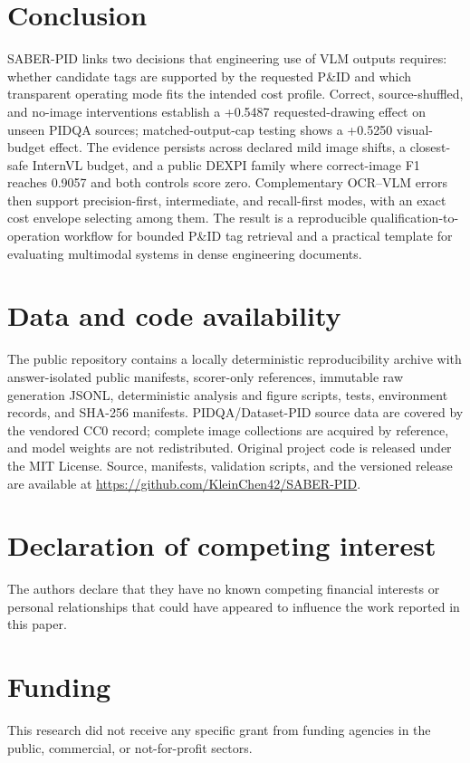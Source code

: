 \documentclass[11pt]{article}
\begin{document}
\section{Conclusion}

SABER-PID links two decisions that engineering use of VLM outputs requires:
whether candidate tags are supported by the requested P\&ID and which
transparent operating mode fits the intended cost profile. Correct,
source-shuffled, and no-image interventions establish a +0.5487
requested-drawing effect on unseen PIDQA sources; matched-output-cap testing
shows a +0.5250 visual-budget effect. The evidence persists across declared
mild image shifts, a closest-safe InternVL budget, and a public DEXPI family
where correct-image F1 reaches 0.9057 and both controls score zero. Complementary
OCR--VLM errors then support precision-first, intermediate, and recall-first
modes, with an exact cost envelope selecting among them. The result is a
reproducible qualification-to-operation workflow for bounded P\&ID tag
retrieval and a practical template for evaluating multimodal systems in dense
engineering documents.

\section*{Data and code availability}

The public repository contains a locally deterministic reproducibility archive with
answer-isolated public manifests, scorer-only references, immutable raw
generation JSONL, deterministic analysis and figure scripts, tests,
environment records, and SHA-256 manifests. PIDQA/Dataset-PID source data are
covered by the vendored CC0 record; complete image collections are acquired by
reference, and model weights are not redistributed. Original project code is
released under the MIT License. Source, manifests, validation scripts, and the
versioned release are available at
\url{https://github.com/KleinChen42/SABER-PID}.

\section*{Declaration of competing interest}
The authors declare that they have no known competing financial interests or
personal relationships that could have appeared to influence the work reported
in this paper.

\section*{Funding}
This research did not receive any specific grant from funding agencies in the public,
commercial, or not-for-profit sectors.
\end{document}
